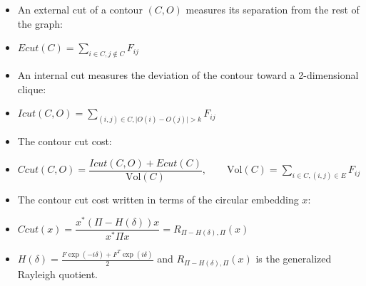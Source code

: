 \documentclass[11pt, a4paper, landscape]{article}
\begin{document}
\NewPage{}
\vfill
\begin{itemize}
\item An external cut of a contour $(C, O)$ measures its separation from the rest of the graph:
\item[]
\begin{center}
$Ecut(C) = \sum\limits_{i \in C, j \notin C} F_{ij}$
\end{center}
\item An internal cut measures the deviation of the contour toward a 2-dimensional clique:
\item[]
\begin{center}
$Icut(C, O) = \sum\limits_{(i, j) \in C, \lvert O(i) - O(j) \rvert > k} F_{ij}$
\end{center}
\item The contour cut cost:
\item[]
\begin{center}
$Ccut(C, O) = \dfrac{Icut(C, O) + Ecut(C)}{\mathrm{Vol}(C)}, \qquad \mathrm{Vol}(C) = \sum_{i \in C, (i, j) \in E} F_{ij}$
\end{center}
\item The contour cut cost written in terms of the circular embedding $x$:
\item[]
\begin{center}
$Ccut(x) = \dfrac{x^*(\Pi - H(\delta))x}{x^* \Pi x} = R_{\Pi - H(\delta), \Pi}(x)$
\end{center}
\item $H(\delta) = \frac{F\exp(-i\delta) + F^T\exp(i\delta)}{2}$ and $R_{\Pi - H(\delta), \Pi}(x)$ is the generalized Rayleigh quotient.
\end{itemize}
\vfill
\end{document}
